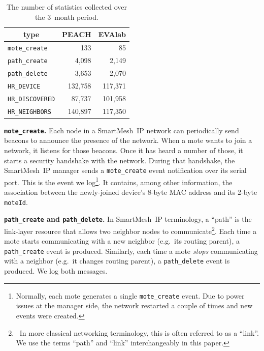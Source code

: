 \documentclass{elsarticle}
\newcommand{\smip}                {SmartMesh~IP\xspace}
\newcommand{\HRNEIGHBORS}         {{\tt HR\_NEIGHBORS}\xspace}
\newcommand{\HRDISCOVERED}        {{\tt HR\_DISCOVERED}\xspace}
\newcommand{\HRDEVICE}            {{\tt HR\_DEVICE}\xspace}
\newcommand{\pathcreate}          {{\tt path\_create}\xspace}
\newcommand{\pathdelete}          {{\tt path\_delete}\xspace}
\newcommand{\motecreate}          {{\tt mote\_create}\xspace}
\newcommand{\moteId}              {{\tt moteId}\xspace}
\newcommand{\PEACHNUMHRNEIGHBORS} {140,897\xspace}
\newcommand{\EVANUMHRNEIGHBORS}   {117,350\xspace}
\begin{document}
\begin{table}
    \centering
    \begin{tabular}{|l|r|r|}
        \toprule
        \multicolumn{1}{|c|}{type} & \multicolumn{1}{|c|}{PEACH} & \multicolumn{1}{|c|}{EVAlab} \\ \hline
        \hline
        \motecreate     &     133     &   85 \\ \hline
        \pathcreate     &   4,098     &   2,149 \\ \hline
        \pathdelete     &   3,653     &   2,070 \\ \hline
        \HRDEVICE       & 132,758     &   117,371 \\ \hline
        \HRDISCOVERED   &  87,737     &   101,958 \\ \hline
        \HRNEIGHBORS    & \PEACHNUMHRNEIGHBORS & \EVANUMHRNEIGHBORS\\ \hline
    \end{tabular}
    \caption{The number of statistics collected over the 3~month period.}
    \label{tab:msg_stats}
\end{table}

\textbf{\motecreate.}
Each node in a \smip network can periodically send beacons to announce the presence of the network.
When a mote wants to join a network, it listens for those beacons.
Once it has heard a number of those, it starts a security handshake with the network.
During that handshake, the \smip manager sends a \motecreate event notification over its serial port.
This is the event we log\footnote{Normally, each mote generates a single \motecreate event. Due to power issues at the manager side, the network restarted a couple of times and new events were created.}.
It contains, among other information, the association between the newly-joined device's 8-byte MAC address and its 2-byte \moteId.

\textbf{\pathcreate and \pathdelete.}
In \smip terminology, a ``path'' is the link-layer resource that allows two neighbor nodes to communicate\footnote{~In more classical networking terminology, this is often referred to as a ``link''. We use the terms ``path'' and ``link'' interchangeably in this paper.}.
Each time a mote starts communicating with a new neighbor (e.g.~its routing parent), a \pathcreate event is produced.
Similarly, each time a mote \textit{stops} communicating with a neighbor (e.g.~it changes routing parent), a \pathdelete event is produced.
We log both messages.
\end{document}

